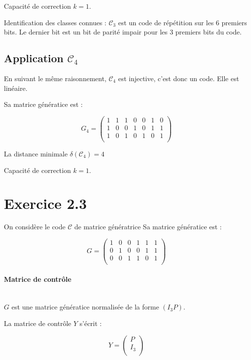 \documentclass[a4paper,11pt]{article}
\begin{document}
Capacité de correction $k=1$.

Identification des classes connues : $\mathcal{C}_3$ est un code de répétition sur les 6 premiers bits. Le dernier bit est un bit de parité impair pour les 3 premiers bits du code.

\subsection*{Application $\mathcal{C}_4$}

En suivant le même raisonnement, $\mathcal{C}_4$ est injective, c'est donc un code. Elle est linéaire.

Sa matrice génératice est :

\[
    G_4=
    \left (
    \begin{array}{ccccccc}
        1&1&1&0&0&1&0 \\
        1&0&0&1&0&1&1 \\
        1&0&1&0&1&0&1 \\
    \end{array}
    \right )
\]

\vspace{2ex}
La distance minimale $\delta{(\mathcal{C}_4)}=4$

Capacité de correction $k=1$.

\section*{Exercice 2.3}

On considère le code $\mathcal{C}$ de matrice génératrice
Sa matrice génératice est :

\[
    G=
    \left (
    \begin{array}{cccccc}
        1&0&0&1&1&1 \\
        0&1&0&0&1&1 \\
        0&0&1&1&0&1 \\
    \end{array}
    \right )
\]

\paragraph{Matrice de contrôle}~\\

$G$ est une matrice génératice normalisée de la forme $(I_3 P)$.

La matrice de contrôle $Y$ s'écrit : 

\[
    Y=
    \left (
    \begin{array}{c}
        P \\
        I_3 \\
    \end{array}
    \right )
\]
\end{document}

